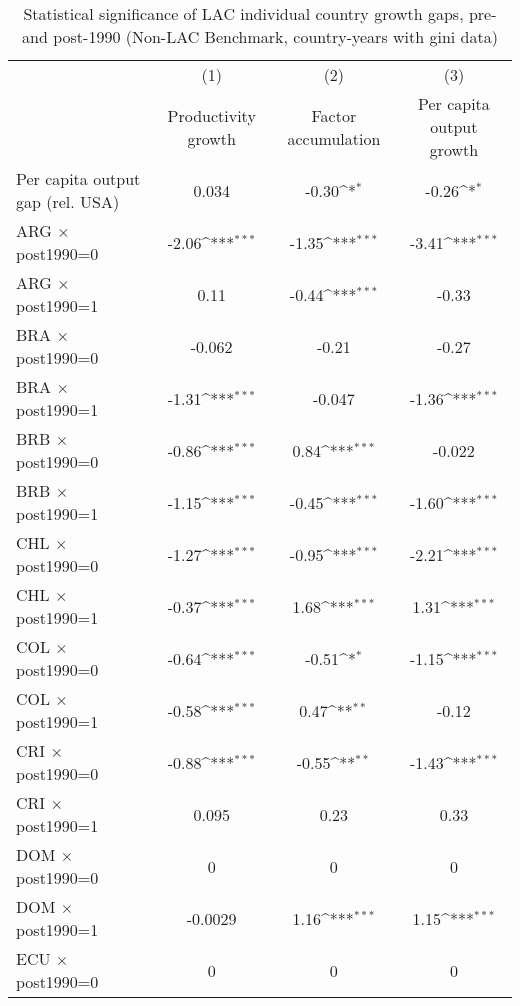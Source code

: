 \begin{table}[htbp]\centering
\def\sym#1{\ifmmode^{#1}\else\(^{#1}\)\fi}
\caption{Statistical significance of LAC individual country growth gaps, pre- and post-1990 (Non-LAC Benchmark, country-years with gini data)}
\begin{tabular}{l*{3}{c}}
\toprule
                &\multicolumn{1}{c}{(1)}&\multicolumn{1}{c}{(2)}&\multicolumn{1}{c}{(3)}\\
                &\multicolumn{1}{c}{Productivity growth}&\multicolumn{1}{c}{Factor accumulation}&\multicolumn{1}{c}{Per capita output growth}\\
\midrule
Per capita output gap (rel. USA)&    0.034         &    -0.30\sym{*}  &    -0.26\sym{*}  \\
ARG $\times$ post1990=0&    -2.06\sym{***}&    -1.35\sym{***}&    -3.41\sym{***}\\
ARG $\times$ post1990=1&     0.11         &    -0.44\sym{***}&    -0.33         \\
BRA $\times$ post1990=0&   -0.062         &    -0.21         &    -0.27         \\
BRA $\times$ post1990=1&    -1.31\sym{***}&   -0.047         &    -1.36\sym{***}\\
BRB $\times$ post1990=0&    -0.86\sym{***}&     0.84\sym{***}&   -0.022         \\
BRB $\times$ post1990=1&    -1.15\sym{***}&    -0.45\sym{***}&    -1.60\sym{***}\\
CHL $\times$ post1990=0&    -1.27\sym{***}&    -0.95\sym{***}&    -2.21\sym{***}\\
CHL $\times$ post1990=1&    -0.37\sym{***}&     1.68\sym{***}&     1.31\sym{***}\\
COL $\times$ post1990=0&    -0.64\sym{***}&    -0.51\sym{*}  &    -1.15\sym{***}\\
COL $\times$ post1990=1&    -0.58\sym{***}&     0.47\sym{**} &    -0.12         \\
CRI $\times$ post1990=0&    -0.88\sym{***}&    -0.55\sym{**} &    -1.43\sym{***}\\
CRI $\times$ post1990=1&    0.095         &     0.23         &     0.33         \\
DOM $\times$ post1990=0&        0         &        0         &        0         \\
DOM $\times$ post1990=1&  -0.0029         &     1.16\sym{***}&     1.15\sym{***}\\
ECU $\times$ post1990=0&        0         &        0         &        0         \\

\end{tabular}
\end{table}
